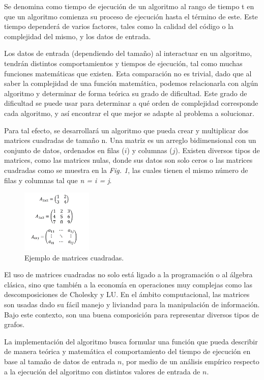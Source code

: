 \documentclass[11pt, twocolumn]{llncs}
\begin{document}
Se denomina como tiempo de ejecución de un algoritmo al rango de tiempo t en que un algoritmo comienza su proceso de ejecución hasta el término de este. Este tiempo dependerá de varios factores, tales como la calidad del código o la complejidad del mismo, y los datos de entrada.

Los datos de entrada (dependiendo del tamaño) al interactuar en un algoritmo, tendrán distintos comportamientos y tiempos de ejecución, tal como muchas funciones matemáticas que existen. Esta comparación no es trivial, dado que al saber la complejidad de una función matemática, podemos relacionarla con algún algoritmo y determinar de forma teórica su grado de dificultad. Este grado de dificultad se puede usar para determinar a qué orden de complejidad corresponde cada algoritmo, y así encontrar el que mejor se adapte al problema a solucionar.

Para tal efecto, se desarrollará un algoritmo que pueda crear y multiplicar dos matrices cuadradas de tamaño n. Una matriz es un arreglo bidimensional con un conjunto de datos, ordenados en filas ($i$) y columnas ($j$). Existen diversos tipos de matrices, como las matrices nulas, donde sus datos son solo ceros o las matrices cuadradas como se muestra en la \textit{Fig. 1}, las cuales tienen el mismo número de filas y columnas tal que \textit{n = i = j}.

\begin{figure}
\caption{\label{fig:matrices}Ejemplo de matrices cuadradas.}
\centering
\includegraphics[width=0.3\textwidth]{matrices.png}
\end{figure}

El uso de matrices cuadradas no solo está ligado a la programación o al álgebra clásica, sino que también a la economía en operaciones muy complejas como las descomposiciones de Cholesky y LU. En el ámbito computacional, las matrices son usadas dado su fácil manejo y liviandad para la manipulación de información. Bajo este contexto, son una buena composición para representar diversos tipos de grafos.

La implementación del algoritmo busca formular una función que pueda describir de manera teórica y matemática el comportamiento del tiempo de ejecución en base al tamaño de datos de entrada $n$, por medio de un análisis empírico respecto a la ejecución del algoritmo con distintos valores de entrada de $n$.
\end{document}
